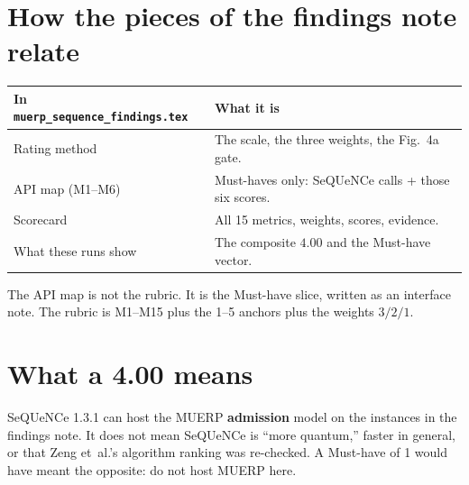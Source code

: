 \documentclass[11pt]{article}
\begin{document}
\section{How the pieces of the findings note relate}

\begin{center}
\begin{tabularx}{\textwidth}{@{}l Y@{}}
\toprule
In \texttt{muerp\_sequence\_findings.tex} & What it is \\
\midrule
Rating method & The scale, the three weights, the Fig.~4a gate. \\
API map (M1--M6) & Must-haves only: SeQUeNCe calls + those six scores. \\
Scorecard & All 15 metrics, weights, scores, evidence. \\
What these runs show & The composite $4.00$ and the Must-have vector. \\
\bottomrule
\end{tabularx}
\end{center}

The API map is not the rubric.
It is the Must-have slice, written as an interface note.
The rubric is M1--M15 plus the 1--5 anchors plus the weights $3/2/1$.

\section{What a 4.00 means}

SeQUeNCe 1.3.1 can host the MUERP \textbf{admission} model on the instances in the findings note.
It does not mean SeQUeNCe is ``more quantum,'' faster in general, or that Zeng et~al.'s algorithm ranking was re-checked.
A Must-have of 1 would have meant the opposite: do not host MUERP here.
\end{document}
